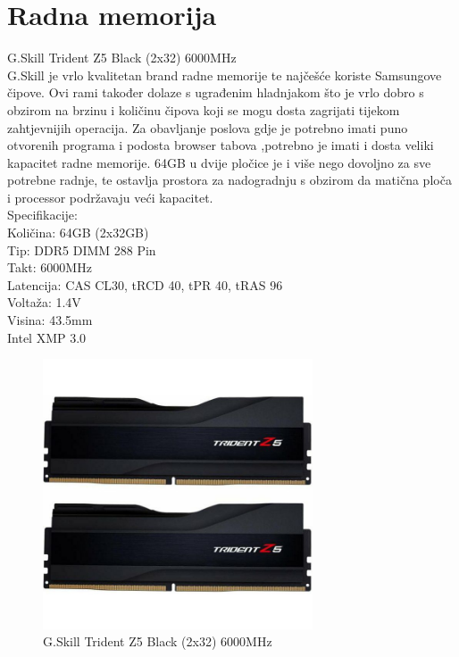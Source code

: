 \documentclass{report}
\begin{document}
\chapter{Radna memorija}
G.Skill Trident Z5 Black (2x32) 6000MHz
\\G.Skill je vrlo kvalitetan brand radne memorije te najčešće koriste Samsungove čipove. Ovi rami također dolaze s ugrađenim hladnjakom što je vrlo dobro s obzirom na brzinu i količinu čipova koji se mogu dosta zagrijati tijekom zahtjevnijih operacija. Za obavljanje poslova gdje je potrebno imati puno otvorenih programa i podosta browser tabova ,potrebno je imati i dosta veliki kapacitet radne memorije. 64GB u dvije pločice je i više nego dovoljno za sve potrebne radnje, te ostavlja prostora za nadogradnju s obzirom da matična ploča i processor podržavaju veći kapacitet.
\\Specifikacije:
\\Količina: 64GB (2x32GB)
\\Tip: DDR5 DIMM 288 Pin
\\Takt: 6000MHz
\\Latencija: CAS CL30, tRCD 40, tPR 40, tRAS 96
\\Voltaža: 1.4V
\\Visina: 43.5mm
\\Intel XMP 3.0
\begin{figure}[h]
\includegraphics[width=8cm]{Radna memorija.jpg}
\caption{G.Skill Trident Z5 Black (2x32) 6000MHz}
\end{figure}
\end{document}
